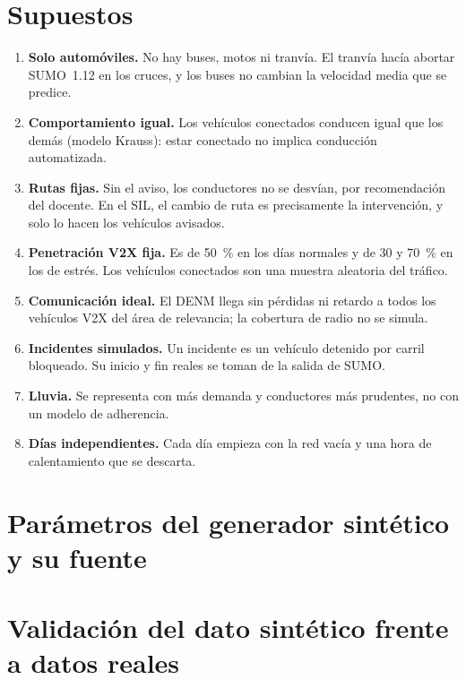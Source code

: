 \section{Supuestos}\label{an:supuestos}
\begin{enumerate}
\item \textbf{Solo automóviles.} No hay buses, motos ni tranvía. El tranvía hacía abortar SUMO~1.12 en los cruces, y los buses no cambian la velocidad media que se predice.
\item \textbf{Comportamiento igual.} Los vehículos conectados conducen igual que los demás (modelo Krauss): estar conectado no implica conducción automatizada.
\item \textbf{Rutas fijas.} Sin el aviso, los conductores no se desvían, por recomendación del docente. En el SIL, el cambio de ruta es precisamente la intervención, y solo lo hacen los vehículos avisados.
\item \textbf{Penetración V2X fija.} Es de 50~\% en los días normales y de 30 y 70~\% en los de estrés. Los vehículos conectados son una muestra aleatoria del tráfico.
\item \textbf{Comunicación ideal.} El DENM llega sin pérdidas ni retardo a todos los vehículos V2X del área de relevancia; la cobertura de radio no se simula.
\item \textbf{Incidentes simulados.} Un incidente es un vehículo detenido por carril bloqueado. Su inicio y fin reales se toman de la salida de SUMO.
\item \textbf{Lluvia.} Se representa con más demanda y conductores más prudentes, no con un modelo de adherencia.
\item \textbf{Días independientes.} Cada día empieza con la red vacía y una hora de calentamiento que se descarta.
\end{enumerate}

\section{Parámetros del generador sintético y su fuente}\label{an:param}


\section{Validación del dato sintético frente a datos reales}\label{an:valida}


